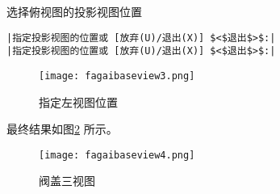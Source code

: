 \begin{procedure}
\begin{figure}[htbp]
\end{figure}
\newpage
选择俯视图的投影视图位置
\begin{lstlisting}
|指定投影视图的位置或 [放弃(U)/退出(X)] $<$退出$>$:|
|指定投影视图的位置或 [放弃(U)/退出(X)] $<$退出$>$:|
\end{lstlisting}
\begin{figure}[htbp]
\centering
\texttt{[image: fagaibaseview3.png]}
\caption{指定左视图位置}\label{fig:fagaibaseview3}
\end{figure}
最终结果如图\ref{fig:fagaibaseview4} 所示。
\begin{figure}[htbp]
\centering
\texttt{[image: fagaibaseview4.png]}
\caption{阀盖三视图}\label{fig:fagaibaseview4}
\end{figure}
\end{procedure}
\endinput